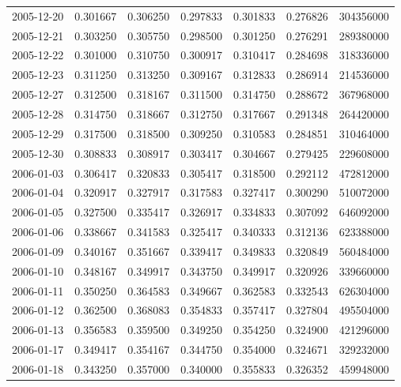 \begin{tabular}{lrrrrrr}
2005-12-20 &    0.301667 &    0.306250 &    0.297833 &    0.301833 &    0.276826 &   304356000 \\
2005-12-21 &    0.303250 &    0.305750 &    0.298500 &    0.301250 &    0.276291 &   289380000 \\
2005-12-22 &    0.301000 &    0.310750 &    0.300917 &    0.310417 &    0.284698 &   318336000 \\
2005-12-23 &    0.311250 &    0.313250 &    0.309167 &    0.312833 &    0.286914 &   214536000 \\
2005-12-27 &    0.312500 &    0.318167 &    0.311500 &    0.314750 &    0.288672 &   367968000 \\
2005-12-28 &    0.314750 &    0.318667 &    0.312750 &    0.317667 &    0.291348 &   264420000 \\
2005-12-29 &    0.317500 &    0.318500 &    0.309250 &    0.310583 &    0.284851 &   310464000 \\
2005-12-30 &    0.308833 &    0.308917 &    0.303417 &    0.304667 &    0.279425 &   229608000 \\
2006-01-03 &    0.306417 &    0.320833 &    0.305417 &    0.318500 &    0.292112 &   472812000 \\
2006-01-04 &    0.320917 &    0.327917 &    0.317583 &    0.327417 &    0.300290 &   510072000 \\
2006-01-05 &    0.327500 &    0.335417 &    0.326917 &    0.334833 &    0.307092 &   646092000 \\
2006-01-06 &    0.338667 &    0.341583 &    0.325417 &    0.340333 &    0.312136 &   623388000 \\
2006-01-09 &    0.340167 &    0.351667 &    0.339417 &    0.349833 &    0.320849 &   560484000 \\
2006-01-10 &    0.348167 &    0.349917 &    0.343750 &    0.349917 &    0.320926 &   339660000 \\
2006-01-11 &    0.350250 &    0.364583 &    0.349667 &    0.362583 &    0.332543 &   626304000 \\
2006-01-12 &    0.362500 &    0.368083 &    0.354833 &    0.357417 &    0.327804 &   495504000 \\
2006-01-13 &    0.356583 &    0.359500 &    0.349250 &    0.354250 &    0.324900 &   421296000 \\
2006-01-17 &    0.349417 &    0.354167 &    0.344750 &    0.354000 &    0.324671 &   329232000 \\
2006-01-18 &    0.343250 &    0.357000 &    0.340000 &    0.355833 &    0.326352 &   459948000 \\

\end{tabular}
